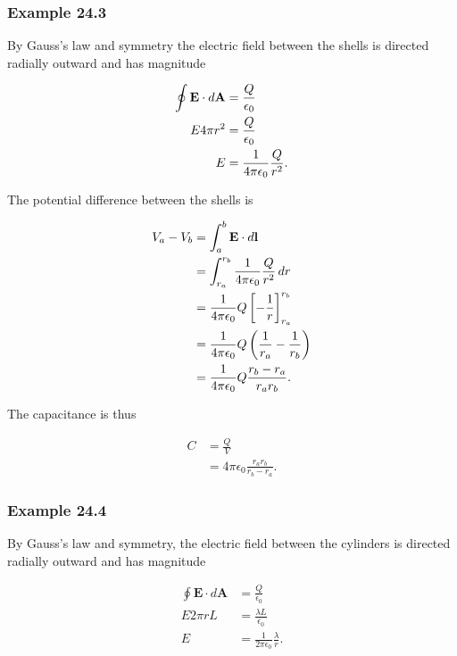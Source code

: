 \documentclass{article}
\begin{document}
\subsubsection{Example 24.3}

By Gauss's law and symmetry the electric field between the shells is directed radially outward and has magnitude

\begin{align*}
  \oint \mathbf{E} \cdot d\mathbf{A} & = \frac{Q}{\epsilon_0} \\
  E 4 \pi r^2                        & = \frac{Q}{\epsilon_0} \\
  E                                  & = \frac{1}{4 \pi \epsilon_0} \frac{Q}{r^2}.
\end{align*}

The potential difference between the shells is

\begin{align*}
  V_a - V_b & = \int_a^b \mathbf{E} \cdot d\mathbf{l}              \\
            & = \int_{r_a}^{r_b} \frac{1}{4 \pi \epsilon_0} \frac{Q}{r^2} \,dr            \\
            & = \frac{1}{4 \pi \epsilon_0} Q \left[ -\frac{1}{r} \right]_{r_a}^{r_b}      \\
            & = \frac{1}{4 \pi \epsilon_0} Q \left( \frac{1}{r_a} - \frac{1}{r_b} \right) \\
            & = \frac{1}{4 \pi \epsilon_0} Q \frac{r_b - r_a}{r_a r_b}.
\end{align*}

The capacitance is thus

\begin{align*}
  C & = \frac{Q}{V}                                 \\
    & = 4 \pi \epsilon_0 \frac{r_a r_b}{r_b - r_a}.
\end{align*}

\subsubsection{Example 24.4}

By Gauss's law and symmetry, the electric field between the cylinders is directed radially outward and has magnitude

\begin{align*}
  \oint \mathbf{E} \cdot d\mathbf{A} & = \frac{Q}{\epsilon_0}                          \\
  E 2 \pi r L                        & = \frac{\lambda L}{\epsilon_0}                  \\
  E                                  & = \frac{1}{2 \pi \epsilon_0} \frac{\lambda}{r}.
\end{align*}
\end{document}
